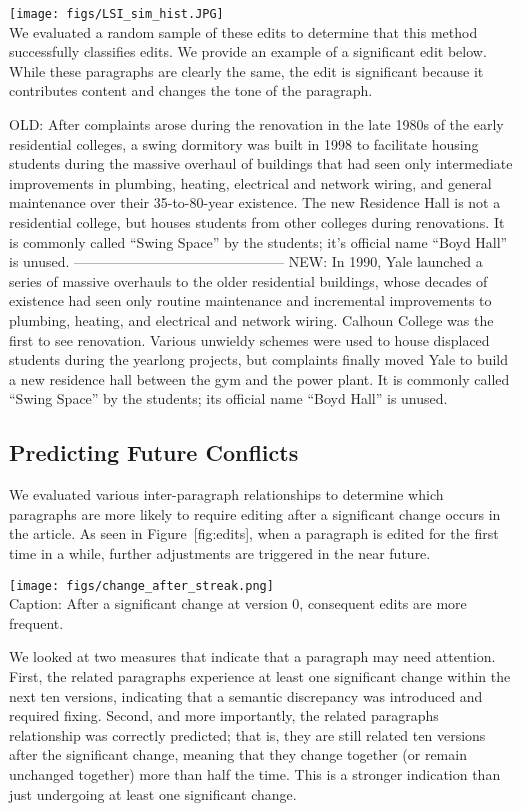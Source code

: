 \texttt{[image: figs/LSI\_sim\_hist.JPG]}\\

We evaluated a random sample of these edits to determine that this
method successfully classifies edits. We provide an example of a
significant edit below. While these paragraphs are clearly the same, the
edit is significant because it contributes content and changes the tone
of the paragraph.

OLD: After complaints arose during the renovation in the late 1980s of
the early residential colleges, a swing dormitory was built in 1998 to
facilitate housing students during the massive overhaul of buildings
that had seen only intermediate improvements in plumbing, heating,
electrical and network wiring, and general maintenance over their
35-to-80-year existence. The new Residence Hall is not a residential
college, but houses students from other colleges during renovations. It
is commonly called ``Swing Space'' by the students; it's official name
``Boyd Hall'' is unused. ---------------------------------------------
NEW: In 1990, Yale launched a series of massive overhauls to the older
residential buildings, whose decades of existence had seen only routine
maintenance and incremental improvements to plumbing, heating, and
electrical and network wiring. Calhoun College was the first to see
renovation. Various unwieldy schemes were used to house displaced
students during the yearlong projects, but complaints finally moved Yale
to build a new residence hall between the gym and the power plant. It is
commonly called ``Swing Space'' by the students; its official name
``Boyd Hall'' is unused.

\subsection{Predicting Future
Conflicts}\label{predicting-future-conflicts-1}

We evaluated various inter-paragraph relationships to determine which
paragraphs are more likely to require editing after a significant change
occurs in the article. As seen in Figure~{[}fig:edits{]}, when a
paragraph is edited for the first time in a while, further adjustments
are triggered in the near future.

\texttt{[image: figs/change\_after\_streak.png]}\\

Caption: After a significant change at version 0, consequent edits are
more frequent.

We looked at two measures that indicate that a paragraph may need
attention. First, the related paragraphs experience at least one
significant change within the next ten versions, indicating that a
semantic discrepancy was introduced and required fixing. Second, and
more importantly, the related paragraphs relationship was correctly
predicted; that is, they are still related ten versions after the
significant change, meaning that they change together (or remain
unchanged together) more than half the time. This is a stronger
indication than just undergoing at least one significant change.

